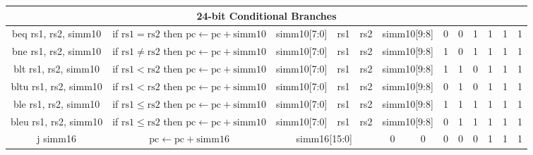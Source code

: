 \documentclass[a4paper,10pt]{article}
\begin{document}
\begin{landscape}
\begin{longtable}[c]{|c|c|@{}c@{}|@{}c@{}|@{}c@{}|@{}c@{}|@{}c@{}|@{}c@{}|@{}c@{}|@{}c@{}|@{}c@{}|@{}c@{}|@{}c@{}|@{}c@{}|@{}c@{}|@{}c@{}|@{}c@{}|@{}c@{}|@{}c@{}|@{}c@{}|@{}c@{}|@{}c@{}|@{}c@{}|@{}c@{}|@{}c@{}|@{}c@{}|}
\hline
\multicolumn{26}{|c|}{24-bit Conditional Branches}                                                                                                                                                                                                                                                             \\\hline
beq rs1, rs2, simm10  & if $\mathrm{rs1} = \mathrm{rs2}$ then $\mathrm{pc} \leftarrow \mathrm{pc} + \mathrm{simm10}$ & \multicolumn{8}{c|}{simm10{[}7:0{]}}                        & \multicolumn{4}{c|}{rs1}            & \multicolumn{4}{c|}{rs2}     & \multicolumn{2}{c|}{simm10{[}9:8{]}} & 0   & 0   & 1   & 1 & 1 & 1 \\
bne rs1, rs2, simm10  & if $\mathrm{rs1} \neq \mathrm{rs2}$ then $\mathrm{pc} \leftarrow \mathrm{pc} + \mathrm{simm10}$ & \multicolumn{8}{c|}{simm10{[}7:0{]}}                        & \multicolumn{4}{c|}{rs1}            & \multicolumn{4}{c|}{rs2}     & \multicolumn{2}{c|}{simm10{[}9:8{]}} & 1   & 0   & 1   & 1 & 1 & 1 \\
blt rs1, rs2, simm10  & if $\mathrm{rs1} < \mathrm{rs2}$ then $\mathrm{pc} \leftarrow \mathrm{pc} + \mathrm{simm10}$ & \multicolumn{8}{c|}{simm10{[}7:0{]}}                        & \multicolumn{4}{c|}{rs1}            & \multicolumn{4}{c|}{rs2}     & \multicolumn{2}{c|}{simm10{[}9:8{]}} & 1   & 1   & 0   & 1 & 1 & 1 \\
bltu rs1, rs2, simm10 & if $\mathrm{rs1} < \mathrm{rs2}$ then $\mathrm{pc} \leftarrow \mathrm{pc} + \mathrm{simm10}$ & \multicolumn{8}{c|}{simm10{[}7:0{]}}                        & \multicolumn{4}{c|}{rs1}            & \multicolumn{4}{c|}{rs2}     & \multicolumn{2}{c|}{simm10{[}9:8{]}} & 0   & 1   & 0   & 1 & 1 & 1 \\
ble rs1, rs2, simm10  & if $\mathrm{rs1} \le \mathrm{rs2}$ then $\mathrm{pc} \leftarrow \mathrm{pc} + \mathrm{simm10}$ & \multicolumn{8}{c|}{simm10{[}7:0{]}}                        & \multicolumn{4}{c|}{rs1}            & \multicolumn{4}{c|}{rs2}     & \multicolumn{2}{c|}{simm10{[}9:8{]}} & 1   & 1   & 1   & 1 & 1 & 1 \\
bleu rs1, rs2, simm10 & if $\mathrm{rs1} \le \mathrm{rs2}$ then $\mathrm{pc} \leftarrow \mathrm{pc} + \mathrm{simm10}$ & \multicolumn{8}{c|}{simm10{[}7:0{]}}                        & \multicolumn{4}{c|}{rs1}            & \multicolumn{4}{c|}{rs2}     & \multicolumn{2}{c|}{simm10{[}9:8{]}} & 0   & 1   & 1   & 1 & 1 & 1 \\
j simm16              & $\mathrm{pc} \leftarrow \mathrm{pc} + \mathrm{simm16}$ & \multicolumn{16}{c|}{simm16{[}15:0{]}}                                                                                         & 0              & 0              & 0 & 0   & 0   & 1 & 1 & 1 \\

\end{longtable}
\end{landscape}
\end{document}
